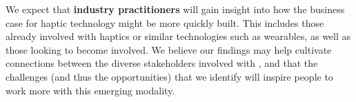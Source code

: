 We expect that
\textbf{industry practitioners} will gain insight into how the business case for haptic technology might be more quickly built.
This includes those already involved with haptics or similar technologies such as wearables, as well as those looking to become involved.
We believe our findings may help cultivate connections between the diverse stakeholders involved with %
\haxd, and that the challenges (and thus the opportunities) that we identify will inspire people to work more with this emerging modality.

